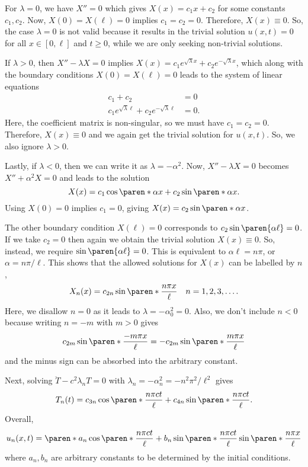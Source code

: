 \documentclass[11pt]{penrose}
\begin{document}
For $\lambda = 0$, we have $X'' = 0$ which gives $X(x) = c_1 x + c_2$ for some constants $c_1, c_2$. Now, $X(0)=X(\ell)=0$ implies $c_1 = c_2 = 0$. Therefore, $X(x) \equiv 0$. So, the case $\lambda = 0$ is not valid because it results in the trivial solution $u(x,t) = 0$ for all $x \in [0, \ell]$ and $t \geq 0$, while we are only seeking non-trivial solutions.

If $\lambda > 0$, then $X'' - \lambda X = 0$ implies $X(x) = c_1 e^{\sqrt{\lambda}x} + c_2 e^{-\sqrt{\lambda}x}$, which along with the boundary conditions $X(0) = X(\ell) = 0$ leads to the system of linear equations
\begin{align}
    c_1 + c_2 &= 0 \\
    c_1 e^{\sqrt{\lambda}\ell} + c_2 e^{-\sqrt{\lambda}\ell} &= 0.
\end{align}
Here, the coefficient matrix is non-singular, so we must have $c_1 = c_2 = 0$. Therefore, $X(x) \equiv 0$ and we again get the trivial solution for $u(x,t)$. So, we also ignore $\lambda > 0$.

Lastly, if $\lambda < 0$, then we can write it as $\lambda = - \alpha^2$. Now, $X'' - \lambda X = 0$ becomes $X'' + \alpha^2 X = 0$ and leads to the solution
\begin{equation}
    X(x) = c_1 \cos\paren*{\alpha x} + c_2 \sin\paren*{\alpha x}.
\end{equation}
Using $X(0) = 0$ implies $c_1 = 0$, giving $X(x) = c_2 \sin\paren*{\alpha x}$.

The other boundary condition $X(\ell) = 0$ corresponds to $c_2 \sin\paren{\alpha \ell} = 0$. If we take $c_2 = 0$ then again we obtain the trivial solution $X(x) \equiv 0$. So, instead, we require $\sin\paren{\alpha \ell} = 0$. This is equivalent to $\alpha \ell = n\pi$, or $\alpha = n\pi / \ell$. This shows that the allowed solutions for $X(x)$ can be labelled by $n$,
\begin{equation}
    X_n (x) = c_{2n} \sin\paren*{\frac{n \pi x}{\ell}}
    \quad n = 1, 2, 3, \dots.
\end{equation}
Here, we disallow $n = 0$ as it leads to $\lambda = -\alpha_0^2 = 0$. Also, we don't include $n < 0$ because writing $n = -m$ with $m > 0$ gives
\begin{equation}
    c_{2m} \sin\paren*{\frac{-m \pi x}{\ell}} = -c_{2m} \sin\paren*{\frac{m \pi x}{\ell}}
\end{equation}
and the minus sign can be absorbed into the arbitrary constant.

Next, solving $\ddot{T} - c^2 \lambda_n T = 0$ with $\lambda_n = -\alpha_n^2 = -n^2\pi^2 / \ell^2$ gives
\begin{equation}
    T_n(t) = c_{3n} \cos\paren*{\frac{n \pi ct}{\ell}} + c_{4n} \sin\paren*{\frac{n \pi ct}{\ell}}.
\end{equation}
Overall,
\begin{equation}
    u_n(x,t) = \paren*{a_{n} \cos\paren*{\frac{n \pi ct}{\ell}} + b_{n} \sin\paren*{\frac{n \pi ct}{\ell}}} \sin\paren*{\frac{n \pi x}{\ell}}
\end{equation}
where $a_n, b_n$ are arbitrary constants to be determined by the initial conditions.
\end{document}
